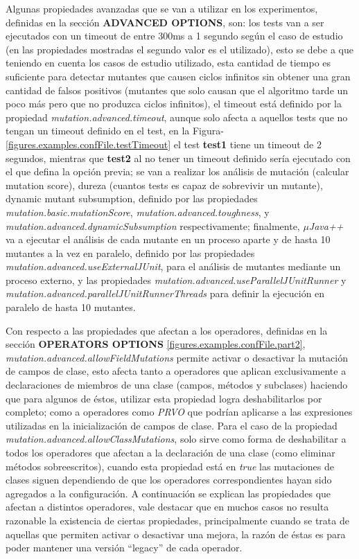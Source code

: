 Algunas propiedades avanzadas que se van a utilizar en los experimentos, definidas en la secci\'on \textbf{ADVANCED OPTIONS}, son: los tests van a ser ejecutados con un timeout de entre 300ms a 1 segundo seg\'un el caso de estudio (en las propiedades mostradas el segundo valor es el utilizado), esto se debe a que teniendo en cuenta los casos de estudio utilizado, esta cantidad de tiempo es suficiente para detectar mutantes que causen ciclos infinitos sin obtener una gran cantidad de falsos positivos (mutantes que solo causan que el algoritmo tarde un poco m\'as pero que no produzca ciclos infinitos), el timeout est\'a definido por la propiedad \emph{mutation.advanced.timeout}, aunque solo afecta a aquellos tests que no tengan un timeout definido en el test, en la Figura-\ref{figures.examples.confFile.testTimeout} el test \textbf{test1} tiene un timeout de 2 segundos, mientras que \textbf{test2} al no tener un timeout definido ser\'ia ejecutado con el que defina la opci\'on previa; se van a realizar los an\'alisis de mutaci\'on (calcular mutation score), dureza (cuantos tests es capaz de sobrevivir un mutante), dynamic mutant subsumption, definido por las propiedades \emph{mutation.basic.mutationScore}, \emph{mutation.advanced.toughness}, y \emph{mutation.advanced.dynamicSubsumption} respectivamente; finalmente, \emph{$\mu$Java++} va a ejecutar el an\'alisis de cada mutante en un proceso aparte y de hasta 10 mutantes a la vez en paralelo, definido por las propiedades \emph{mutation.advanced.useExternalJUnit}, para el an\'alisis de mutantes mediante un proceso externo, y las propiedades \emph{mutation.advanced.useParallelJUnitRunner} y \emph{mutation.advanced.parallelJUnitRunnerThreads} para definir la ejecuci\'on en paralelo de hasta 10 mutantes.

Con respecto a las propiedades que afectan a los operadores, definidas en la secci\'on \textbf{OPERATORS OPTIONS} \ref{figures.examples.confFile.part2}, \emph{mutation.advanced.allowFieldMutations} permite activar o desactivar la mutaci\'on de campos de clase, esto afecta tanto a operadores que aplican exclusivamente a declaraciones de miembros de una clase (campos, m\'etodos y subclases) haciendo que para algunos de \'estos, utilizar esta propiedad logra deshabilitarlos por completo; como a operadores como \emph{PRVO} que podr\'ian aplicarse a las expresiones utilizadas en la inicializaci\'on de campos de clase. Para el caso de la propiedad \emph{mutation.advanced.allowClassMutations}, solo sirve como forma de deshabilitar a todos los operadores que afectan a la declaraci\'on de una clase (como eliminar m\'etodos sobreescritos), cuando esta propiedad est\'a en \emph{true} las mutaciones de clases siguen dependiendo de que los operadores correspondientes hayan sido agregados a la configuraci\'on. A continuaci\'on se explican las propiedades que afectan a distintos operadores, vale destacar que en muchos casos no resulta razonable la existencia de ciertas propiedades, principalmente cuando se trata de aquellas que permiten activar o desactivar una mejora, la raz\'on de \'estas es para poder mantener una versi\'on ``legacy'' de cada operador.

